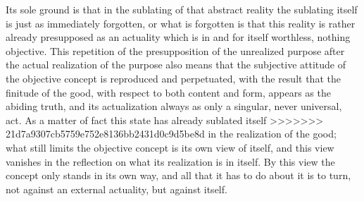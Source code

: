 Its sole ground is that in the sublating of that abstract reality
the sublating itself is just as immediately forgotten,
or what is forgotten is that this reality is
rather already presupposed as an actuality
which is in and for itself worthless, nothing objective.
This repetition of the presupposition of
the unrealized purpose after
the actual realization of the purpose
also means that the subjective attitude of
the objective concept is reproduced and perpetuated,
with the result that the finitude of the good,
with respect to both content and form,
appears as the abiding truth,
and its actualization always as
only a singular, never universal, act.
As a matter of fact this state has
already sublated itself
>>>>>>> 21d7a9307cb5759e752e8136bb2431d0c9d5be8d
in the realization of the good;
what still limits the objective concept is
its own view of itself,
and this view vanishes in the reflection
on what its realization is in itself.
By this view the concept only stands in its own way,
and all that it has to do about it is to turn,
not against an external actuality, but against itself.

